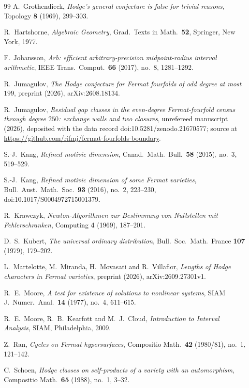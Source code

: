 \documentclass[11pt]{amsart}
\theoremstyle{definition}
\theoremstyle{remark}
\numberwithin{equation}{section}
\begin{document}
\begin{thebibliography}{99}
A.~Grothendieck, \emph{Hodge's general conjecture is false for trivial reasons}, Topology \textbf{8} (1969), 299--303.

R.~Hartshorne, \emph{Algebraic Geometry}, Grad.\ Texts in Math.\ \textbf{52}, Springer, New York, 1977.

F.~Johansson, \emph{Arb: efficient arbitrary-precision midpoint-radius interval arithmetic}, IEEE Trans.\ Comput.\ \textbf{66} (2017), no.~8, 1281--1292.

R.~Jumagulov, \emph{The Hodge conjecture for Fermat fourfolds of odd degree at most $199$}, preprint (2026), arXiv:2608.18134.

R.~Jumagulov, \emph{Residual gap classes in the even-degree Fermat-fourfold census through degree $250$: exchange walls and two closures}, unrefereed manuscript (2026), deposited with the data record doi:10.5281/zenodo.21670577; source at \url{https://github.com/rifmj/fermat-fourfolds-boundary}.

S.-J.~Kang, \emph{Refined motivic dimension}, Canad.\ Math.\ Bull.\ \textbf{58} (2015), no.~3, 519--529.

S.-J.~Kang, \emph{Refined motivic dimension of some Fermat varieties}, Bull.\ Aust.\ Math.\ Soc.\ \textbf{93} (2016), no.~2, 223--230, doi:10.1017/S0004972715001379.

R.~Krawczyk, \emph{Newton-Algorithmen zur Bestimmung von Nullstellen mit Fehlerschranken}, Computing \textbf{4} (1969), 187--201.

D.~S.~Kubert, \emph{The universal ordinary distribution}, Bull.\ Soc.\ Math.\ France \textbf{107} (1979), 179--202.

L.~Martelotte, M.~Miranda, H.~Movasati and R.~Villaflor, \emph{Lengths of Hodge characters in Fermat varieties}, preprint (2026), arXiv:2609.27301v1.

R.~E.~Moore, \emph{A test for existence of solutions to nonlinear systems}, SIAM J.\ Numer.\ Anal.\ \textbf{14} (1977), no.~4, 611--615.

R.~E.~Moore, R.~B.~Kearfott and M.~J.~Cloud, \emph{Introduction to Interval Analysis}, SIAM, Philadelphia, 2009.

Z.~Ran, \emph{Cycles on Fermat hypersurfaces}, Compositio Math.\ \textbf{42} (1980/81), no.~1, 121--142.

C.~Schoen, \emph{Hodge classes on self-products of a variety with an automorphism}, Compositio Math.\ \textbf{65} (1988), no.~1, 3--32.


\end{thebibliography}
\end{document}
